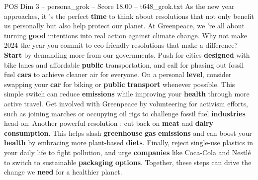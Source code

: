 \begin{textsample}{POS Dim 3 – persona\_grok – Score 18.00 – t648\_grok.txt}  \label{ex:f3_pos_036}
As the new year approaches, it 's the perfect \textbf{time} to think about resolutions that not only benefit us personally but also help protect our planet.
At Greenpeace, we 're all about turning \textbf{good} intentions into real action against climate change.
Why not make 2024 the year you commit to eco-friendly resolutions that make a difference? \textbf{Start} by demanding more from our governments.
Push for cities \textbf{designed} with bike lanes and affordable \textbf{public} transportation, and call for phasing out fossil fuel \textbf{cars} to achieve cleaner air for everyone.
On a personal \textbf{level}, consider swapping your \textbf{car} for biking or \textbf{public} \textbf{transport} whenever possible.
This simple switch can reduce \textbf{emissions} while improving your \textbf{health} through more active travel.
Get involved with Greenpeace by volunteering for activism efforts, such as joining marches or occupying oil rigs to challenge fossil fuel \textbf{industries} head-on.
Another powerful resolution : cut back on \textbf{meat} and \textbf{dairy} \textbf{consumption}.
This helps slash \textbf{greenhouse} \textbf{gas} \textbf{emissions} and can boost your \textbf{health} by embracing more plant-based \textbf{diets}.
Finally, reject single-use plastics in your daily life to fight pollution, and urge \textbf{companies} like Coca-Cola and Nestlé to switch to sustainable \textbf{packaging} \textbf{options}.
Together, these steps can drive the change we \textbf{need} for a healthier planet.

\end{textsample}
